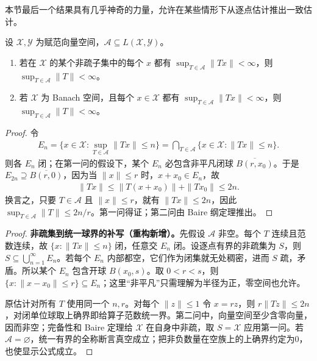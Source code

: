 \documentclass[../../main.tex]{subfiles}
\begin{document}
本节最后一个结果具有几乎神奇的力量，允许在某些情形下从逐点估计推出一致估计。
\begin{theorem}[一致有界原理]\label{theorem:ch05-uniform-boundedness}
设 $\mathcal X,\mathcal Y$ 为赋范向量空间，$\mathcal A\subseteq L(\mathcal X,\mathcal Y)$。
\begin{enumerate}
\item\label{item:ch05-uniform-boundedness-nonmeager} 若在 $\mathcal X$ 的某个非疏子集中的每个 $x$ 都有 $\sup_{T\in\mathcal A}\|Tx\|<\infty$，则 $\sup_{T\in\mathcal A}\|T\|<\infty$。
\item\label{item:ch05-uniform-boundedness-banach} 若 $\mathcal X$ 为 Banach 空间，且每个 $x\in\mathcal X$ 都有 $\sup_{T\in\mathcal A}\|Tx\|<\infty$，则 $\sup_{T\in\mathcal A}\|T\|<\infty$。
\end{enumerate}
\end{theorem}
\begin{proof}
令
\begin{align*}
E_n=\{x\in\mathcal X:\sup_{T\in\mathcal A}\|Tx\|\le n\}
=\bigcap_{T\in\mathcal A}\{x\in\mathcal X:\|Tx\|\le n\}.
\end{align*}
则各 $E_n$ 闭；在第一问的假设下，某个 $E_n$ 必包含非平凡闭球 $\overline{B(r,x_0)}$。于是 $E_{2n}\supseteq\overline{B(r,0)}$，因为当 $\|x\|\le r$ 时，$x+x_0\in E_n$，故
\begin{align*}
\|Tx\|\le\|T(x+x_0)\|+\|Tx_0\|\le2n.
\end{align*}
换言之，只要 $T\in\mathcal A$ 且 $\|x\|\le r$，就有 $\|Tx\|\le2n$，因此 $\sup_{T\in\mathcal A}\|T\|\le2n/r$。第一问得证；第二问由 Baire 纲定理推出。
\end{proof}
\begin{proof}
\textbf{非疏集到统一球界的补写（重构新增）。}先假设 $\mathcal A$ 非空。每个 $T$ 连续且范数连续，故 $\{x:\|Tx\|\le n\}$ 闭，任意交 $E_n$ 闭。设逐点有界的非疏集为 $S$，则 $S\subseteq\bigcup_{n=1}^\infty E_n$。若每个 $E_n$ 内部都空，它们作为闭集就无处稠密，进而 $S$ 疏，矛盾。所以某个 $E_n$ 包含开球 $B(x_0,s)$。取 $0<r<s$，则 $\{x:\|x-x_0\|\le r\}\subseteq E_n$；这里“非平凡”只需理解为半径为正，零空间也允许。

原估计对所有 $T$ 使用同一个 $n,r$。对每个 $\|z\|\le1$ 令 $x=rz$，则 $r\|Tz\|\le2n$，对闭单位球取上确界即给算子范数统一界。第二问中，向量空间至少含零向量，因而非空；完备性和 Baire 定理给 $\mathcal X$ 在自身中非疏，取 $S=\mathcal X$ 应用第一问。若 $\mathcal A=\varnothing$，统一有界的全称断言真空成立；把非负数量在空族上的上确界约定为0，也使显示公式成立。
\end{proof}
\end{document}
